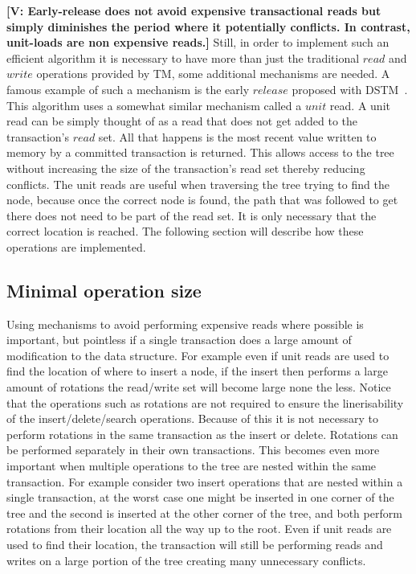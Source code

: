 \documentclass[10pt]{sigplanconf}
\newcommand{\vincent}[1]{{\bf [V: #1]}}
\begin{document}
\vincent{Early-release does not avoid expensive transactional reads but simply diminishes the period where it potentially conflicts. In contrast, unit-loads are non expensive reads.}
Still, in order to implement such an efficient algorithm it is necessary to have more than just the traditional $read$ and $write$ operations provided by TM, some additional mechanisms are needed.
A famous example of such a mechanism is the early $release$ proposed with 
DSTM~\cite{HLMS03}.
This algorithm uses a somewhat similar mechanism called a $unit$ read.
A unit read can be simply thought of as a read that does not get added to the transaction's $read$ set.
All that happens is the most recent value written to memory by a  committed transaction is returned.
This allows access to the tree without increasing the size of the transaction's read set thereby reducing conflicts.
The unit reads are useful when traversing the tree trying to find the node, because once the correct node is found, the path that was followed to get there does not need to be part of the read set.
It is only necessary that the correct location is reached.
The following section will describe how these operations are implemented.

\subsection{Minimal operation size}
Using mechanisms to avoid performing expensive reads where possible is important, but pointless if a single transaction does a large amount of modification to the data structure.
For example even if unit reads are used to find the location of where to insert a node, if the insert then performs a large amount of rotations
the read/write set will become large none the less.
Notice that the operations such as rotations are not required to ensure the linerisability of the insert/delete/search operations.
Because of this it is not necessary to perform rotations in the same transaction as the insert or delete.
Rotations can be performed separately in their own transactions.
This becomes even more important when multiple operations to the tree are nested within the same transaction.
For example consider two insert operations that are nested within a single transaction, at the worst case one might be inserted in one corner of the tree
and the second is inserted at the other corner of the tree, and both perform rotations from their location all the way up to the root.
Even if unit reads are used to find their location, the transaction will still be performing reads and writes on a large portion of the tree creating many unnecessary conflicts.
\end{document}

